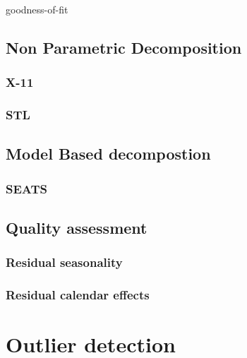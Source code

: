 \documentclass[
  letterpaper,
  DIV=11,
  numbers=noendperiod]{scrreprt}
\begin{document}
goodness-of-fit

\hypertarget{non-parametric-decomposition}{%
\section{Non Parametric
Decomposition}\label{non-parametric-decomposition}}

\hypertarget{x-11}{%
\subsection{X-11}\label{x-11}}

\hypertarget{stl-1}{%
\subsection{STL}\label{stl-1}}

\hypertarget{model-based-decompostion}{%
\section{Model Based decompostion}\label{model-based-decompostion}}

\hypertarget{seats}{%
\subsection{SEATS}\label{seats}}

\hypertarget{quality-assessment}{%
\section{Quality assessment}\label{quality-assessment}}

\hypertarget{residual-seasonality}{%
\subsection{Residual seasonality}\label{residual-seasonality}}

\hypertarget{residual-calendar-effects}{%
\subsection{Residual calendar effects}\label{residual-calendar-effects}}

\hypertarget{outlier-detection}{%
\chapter{Outlier detection}\label{outlier-detection}}
\end{document}
